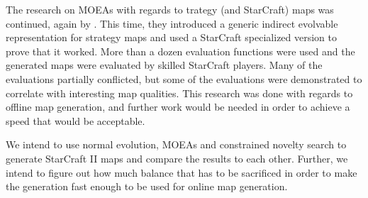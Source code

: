 The research on MOEAs with regards to trategy (and StarCraft) maps was continued, again by \citeauthor{Togelius2013Controllable}\cite{Togelius2013Controllable}. This time, they introduced a generic indirect evolvable representation for strategy maps and used a StarCraft specialized version to prove that it worked. More than a dozen evaluation functions were used and the generated maps were evaluated by skilled StarCraft players. Many of the evaluations partially conflicted, but some of the evaluations were demonstrated to correlate with interesting map qualities. This research was done with regards to offline map generation, and further work would be needed in order to achieve a speed that would be acceptable.

We intend to use normal evolution, MOEAs and constrained novelty search to generate StarCraft II maps and compare the results to each other. Further, we intend to figure out how much balance that has to be sacrificed in order to make the generation fast enough to be used for online map generation.